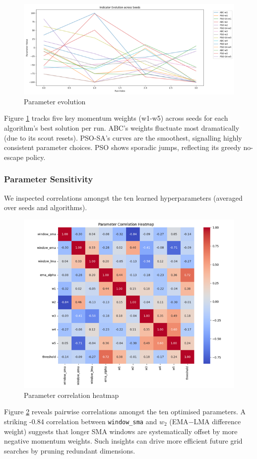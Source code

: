 \documentclass[a4paper, 12pt]{extarticle}
\begin{document}
\begin{figure}[H]
    \centering
    \includegraphics[width=\textwidth]{./assets/parameter_weights.png}
    \caption{Parameter evolution}
    \label{fig:parameter}
\end{figure}
Figure \ref{fig:parameter} tracks five key momentum weights (w1-w5) across seeds for each algorithm's best solution per run. ABC's weights fluctuate most dramatically (due to its scout resets). PSO-SA's curves are the smoothest, signalling highly consistent parameter choices. PSO shows sporadic jumps, reflecting its greedy no-escape policy. 

\newpage
\subsubsection{Parameter Sensitivity}
We inspected correlations amongst the ten learned hyperparameters (averaged over seeds and algorithms).
\begin{figure}[H]
    \centering
    \includegraphics[width=\textwidth]{./assets/sensitivity.png}
    \caption{Parameter correlation heatmap}
    \label{fig:sensitivity}
\end{figure}
Figure \ref{fig:sensitivity} reveals pairwise correlations amongst the ten optimised parameters. A striking -0.84 correlation between \texttt{window\_sma} and $w_2$ (EMA$-$LMA difference weight) suggests that longer SMA windows are systematically offset by more negative momentum weights. Such insights can drive more efficient future grid searches by pruning redundant dimensions. 
\end{document}
